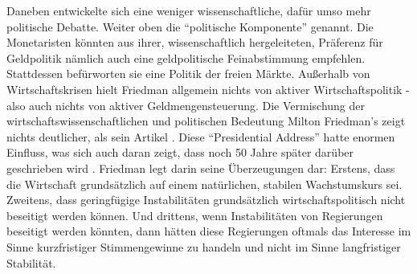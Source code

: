 Daneben entwickelte sich eine weniger wissenschaftliche, dafür umso mehr politische Debatte. Weiter oben die "`politische Komponente"' genannt. Die Monetaristen könnten aus ihrer, wissenschaftlich hergeleiteten, Präferenz für Geldpolitik nämlich auch eine geldpolitische Feinabstimmung empfehlen. Stattdessen befürworten sie eine Politik der freien Märkte. Außerhalb von Wirtschaftskrisen hielt Friedman allgemein nichts von aktiver Wirtschaftspolitik - also auch nichts von aktiver Geldmengensteuerung. Die Vermischung der wirtschaftswissenschaftlichen und politischen Bedeutung Milton Friedman's zeigt nichts deutlicher, als sein Artikel \textcite{Friedman1968}. Diese "`Presidential Address"' hatte enormen Einfluss, was sich auch daran zeigt, dass noch 50 Jahre später darüber geschrieben wird \parencite{Mankiw2018}. Friedman legt darin seine Überzeugungen dar: Erstens, dass die Wirtschaft grundsätzlich auf einem natürlichen, stabilen Wachstumskurs sei. Zweitens, dass geringfügige Instabilitäten grundsätzlich wirtschaftspolitisch nicht beseitigt werden können. Und drittens, wenn Instabilitäten von Regierungen beseitigt werden könnten, dann hätten diese Regierungen oftmals das Interesse im Sinne kurzfristiger Stimmengewinne zu handeln und nicht im Sinne langfristiger Stabilität. 

